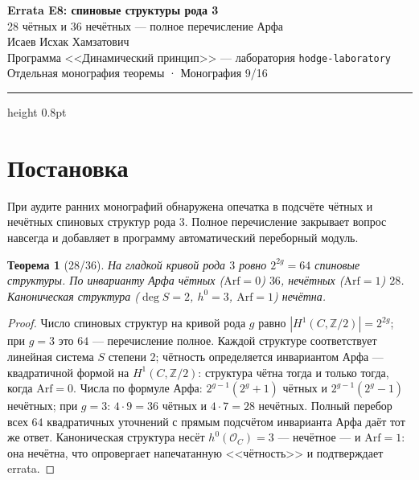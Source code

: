 \documentclass[11pt,a4paper]{article}
\theoremstyle{plain}
\newtheorem{theorem}{Теорема}
\theoremstyle{definition}
\theoremstyle{remark}
\newcommand{\ZZ}{\mathbb{Z}}
\begin{document}
\begin{center}
{\LARGE\bfseries Errata E8: спиновые структуры рода 3}\\[0.4em]
{\large 28 чётных и 36 нечётных — полное перечисление Арфа}\\[0.6em]
{\normalsize Исаев Исхак Хамзатович}\\[0.2em]
{\small Программа <<Динамический принцип>> --- лаборатория \texttt{hodge-laboratory}}\\[0.15em]
{\small Отдельная монография теоремы · Монография 9/16}
\end{center}
\vspace{0.4em}
{\color{linkblue}\hrule height 0.8pt}
\vspace{0.8em}

\section{Постановка}

При аудите ранних монографий обнаружена опечатка в подсчёте чётных
и нечётных спиновых структур рода $3$. Полное перечисление закрывает
вопрос навсегда и добавляет в программу автоматический переборный
модуль.

\begin{theorem}[28/36]\label{th:e8stand}
На гладкой кривой рода $3$ ровно $2^{2g}=64$ спиновые структуры.
По инварианту Арфа чётных ($\mathrm{Arf}=0$) $36$, нечётных
($\mathrm{Arf}=1$) $28$. Каноническая структура ($\deg S=2$,
$h^0=3$, $\mathrm{Arf}=1$) нечётна.
\end{theorem}

\begin{proof}
Число спиновых структур на кривой рода $g$ равно
$|H^1(C,\ZZ/2)|=2^{2g}$; при $g=3$ это $64$ --- перечисление полное.
Каждой структуре соответствует линейная система $S$ степени $2$;
чётность определяется инвариантом Арфа --- квадратичной формой на
$H^1(C,\ZZ/2)$: структура чётна тогда и только тогда, когда
$\mathrm{Arf}=0$. Числа по формуле Арфа: $2^{g-1}(2^g+1)$ чётных и
$2^{g-1}(2^g-1)$ нечётных; при $g=3$: $4\cdot9=36$ чётных и
$4\cdot7=28$ нечётных. Полный перебор всех $64$ квадратичных
уточнений с прямым подсчётом инварианта Арфа даёт тот же ответ.
Каноническая структура несёт $h^0(\mathcal O_C)=3$ --- нечётное ---
и $\mathrm{Arf}=1$: она нечётна, что опровергает напечатанную
<<чётность>> и подтверждает errata.
\end{proof}
\end{document}
